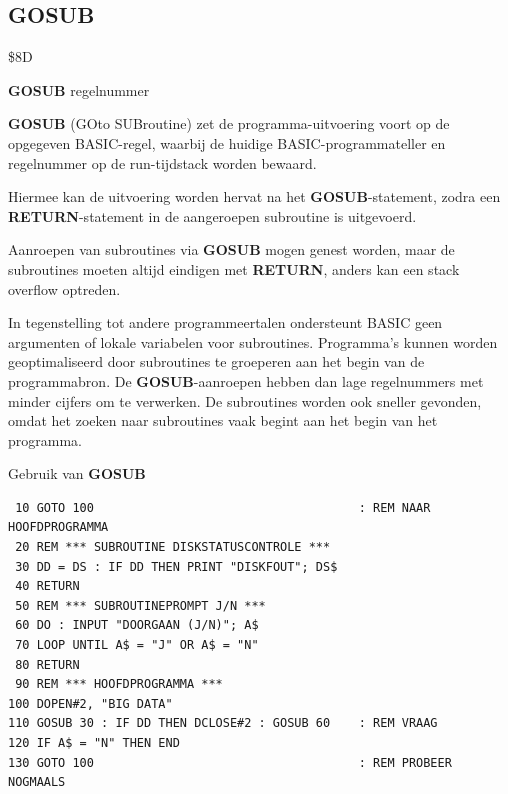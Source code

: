\subsection{GOSUB}
\begin{description}[leftmargin=2cm,style=nextline]
\item [Token:]    \$8D

\item [Formaat:]   {\bf GOSUB} regelnummer

\item [Gebruik:]    {\bf GOSUB} (GOto SUBroutine) zet de programma-uitvoering voort op de opgegeven BASIC-regel, waarbij de huidige BASIC-programmateller en regelnummer op de run-tijdstack worden bewaard.

                  Hiermee kan de uitvoering worden hervat na het {\bf GOSUB}-statement, zodra een {\bf RETURN}-statement in de aangeroepen subroutine is uitgevoerd.

                  Aanroepen van subroutines via {\bf GOSUB} mogen genest worden, maar de subroutines moeten altijd eindigen met {\bf RETURN}, anders kan een stack overflow optreden.

\item [Opmerkingen:]  In tegenstelling tot andere programmeertalen ondersteunt BASIC geen argumenten of lokale variabelen voor subroutines. Programma's kunnen worden geoptimaliseerd door subroutines te groeperen aan het begin van de programmabron. De {\bf GOSUB}-aanroepen hebben dan lage regelnummers met minder cijfers om te verwerken. De subroutines worden ook sneller gevonden, omdat het zoeken naar subroutines vaak begint aan het begin van het programma.

\item [Voorbeeld:]  Gebruik van {\bf GOSUB}

\begin{tcolorbox}[colback=black,coltext=white]
\verbatimfont{\codefont}
\begin{verbatim}
 10 GOTO 100                                     : REM NAAR HOOFDPROGRAMMA
 20 REM *** SUBROUTINE DISKSTATUSCONTROLE ***
 30 DD = DS : IF DD THEN PRINT "DISKFOUT"; DS$
 40 RETURN
 50 REM *** SUBROUTINEPROMPT J/N ***
 60 DO : INPUT "DOORGAAN (J/N)"; A$
 70 LOOP UNTIL A$ = "J" OR A$ = "N"
 80 RETURN
 90 REM *** HOOFDPROGRAMMA ***
100 DOPEN#2, "BIG DATA"
110 GOSUB 30 : IF DD THEN DCLOSE#2 : GOSUB 60    : REM VRAAG
120 IF A$ = "N" THEN END
130 GOTO 100                                     : REM PROBEER NOGMAALS
\end{verbatim}
\end{tcolorbox}
\end{description}

